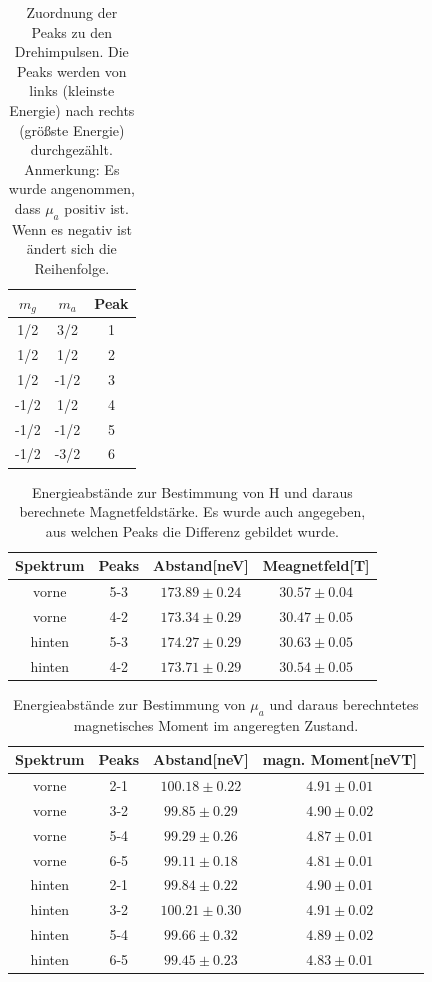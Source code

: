 \documentclass[12pt,a4paper]{article}
\begin{document}
\begin{table}
\centering
\begin{tabular}{|c|c|c|}
\hline 
$m_g$ & $m_a$ & Peak \\ 
\hline 
1/2 & 3/2 & 1 \\ 
\hline 
1/2 & 1/2 & 2 \\  
\hline 
1/2 & -1/2 & 3 \\ 
\hline 
-1/2 & 1/2 & 4 \\ 
\hline 
-1/2 & -1/2 & 5 \\ 
\hline 
-1/2 & -3/2 & 6 \\ 
\hline 
\end{tabular} 
\caption{Zuordnung der Peaks zu den Drehimpulsen. Die Peaks werden von links (kleinste Energie) nach rechts (größste Energie) durchgezählt. Anmerkung: Es wurde angenommen, dass $\mu_a$ positiv ist. Wenn es negativ ist ändert sich die Reihenfolge.}
\label{tab:Hyper_Zuordnung}
\end{table}

\begin{table}
\centering
\begin{tabular}{|c|c|c|c|}
\hline 
Spektrum & Peaks & Abstand[neV] & Meagnetfeld[T]\\ 
\hline 
vorne & 5-3 & $173.89\pm 0.24$ & $30.57\pm 0.04$\\ 
\hline 
vorne & 4-2 & $173.34\pm 0.29$& $30.47\pm 0.05$\\ 
\hline 
\hline 
hinten & 5-3 & $174.27\pm 0.29$ & $30.63\pm 0.05$\\ 
\hline 
hinten & 4-2 & $173.71\pm 0.29$& $30.54\pm 0.05$\\ 
\hline 
\end{tabular} 
\caption{Energieabstände zur Bestimmung von H und daraus berechnete Magnetfeldstärke. Es wurde auch angegeben, aus welchen Peaks die Differenz gebildet wurde.}
\label{tab:Hyper_H}
\end{table}

\begin{table}
\centering
\begin{tabular}{|c|c|c|c|}
\hline 
Spektrum & Peaks & Abstand[neV] & magn. Moment[neVT]\\ 
\hline 
vorne & 2-1 & $100.18 	\pm 0.22$ & $4.91\pm 0.01$\\ 
\hline 
vorne & 3-2 & $99.85\pm 0.29$& $4.90\pm 0.02$\\ 
\hline
vorne & 5-4 & $99.29\pm 0.26$& $4.87\pm 0.01$\\ 
\hline 
vorne & 6-5 & $99.11\pm 0.18$& $4.81\pm 0.01$\\ 
\hline 
\hline 
hinten & 2-1 & $99.84\pm 0.22$ & $4.90\pm 0.01$\\ 
\hline 
hinten & 3-2 & $100.21\pm 0.30$& $4.91\pm 0.02$\\ 
\hline
hinten & 5-4 & $99.66\pm 0.32$& $4.89\pm 0.02$\\ 
\hline 
hinten & 6-5 & $99.45\pm 0.23$& $4.83\pm 0.01$\\ 
\hline 
\end{tabular} 
\caption{Energieabstände zur Bestimmung von $\mu_a$ und daraus berechntetes magnetisches Moment im angeregten Zustand.}
\label{tab:Hyper_mu}
\end{table}
\end{document}
